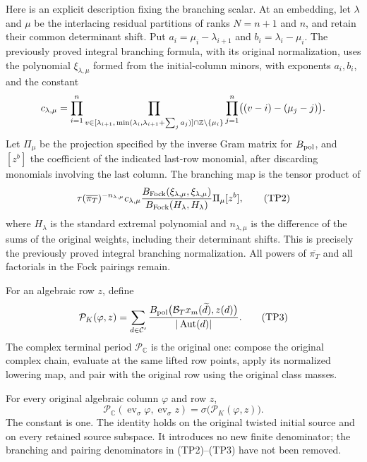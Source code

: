 Here is an explicit description fixing the branching scalar. At an
embedding, let $\lambda$ and $\mu$ be the interlacing residual
partitions of ranks $N=n+1$ and $n$, and retain their common determinant
shift. Put $a_i=\mu_i-\lambda_{i+1}$ and
$b_i=\lambda_i-\mu_i$. The previously proved integral branching
formula, with its original normalization\cite{theta-period-branching}, uses the polynomial
$\xi_{\lambda,\mu}$ formed from the initial-column minors, with
exponents $a_i,b_i$, and the constant
\[
 c_{\lambda,\mu}=
 \prod_{i=1}^n\space
 \prod_{v\in [\lambda_{i+1},\,\min(\lambda_i,\lambda_{i+1}+
                                     \sum_j a_j)]\cap\mathbb Z
                       \setminus\{\mu_i\}}
 \prod_{j=1}^n\bigl((v-i)-(\mu_j-j)\bigr).
\]
Let $\Pi_\mu$ be the projection specified by the inverse Gram matrix
for $B_{\rm pol}$, and $[z^b]$ the coefficient of the indicated
last-row monomial, after discarding monomials involving the last
column. The branching map is the tensor product of
\[
 \tau(\overline{\pi_T})^{-n_{\lambda,\mu}}
 c_{\lambda,\mu}
 \frac{B_{\rm Fock}(\xi_{\lambda,\mu},\xi_{\lambda,\mu})}
      {B_{\rm Fock}(H_\lambda,H_\lambda)}
                 \Pi_\mu[z^b],
 \tag{TP2}
\]
where $H_\lambda$ is the standard extremal polynomial and
$n_{\lambda,\mu}$ is the difference of the sums of the original
weights, including their determinant shifts. This is precisely the
previously proved integral branching normalization. All powers of
$\overline{\pi_T}$ and all factorials in the Fock pairings remain.

For an algebraic row $z$, define
\[
 \mathcal P_K(\varphi,z)=
 \sum_{d\in\mathcal C'}\frac{
   B_{\rm pol}\bigl(\mathcal B_T x_m(\widetilde d),z(d)\bigr)}
                              {|\operatorname{Aut}(d)|}.
 \tag{TP3}
\]
The complex terminal period $\mathcal P_{\mathbb C}$ is the original
one: compose the original complex chain, evaluate at the same lifted
row points, apply its normalized lowering map, and pair with the
original row using the original class masses.

\begin{theorem}
\label{thm:actual-algebraic-terminal-period}
For every original algebraic column $\varphi$ and row $z$,
\[
 \mathcal P_{\mathbb C}(\operatorname{ev}_\sigma\varphi,
                       \operatorname{ev}_\sigma z)
                         =\sigma\bigl(\mathcal P_K(\varphi,z)\bigr).
 \tag{TP4}
\]
The constant is one. The identity holds on the original twisted
initial source and on every retained source subspace. It introduces
no new finite denominator; the branching and pairing denominators
in (TP2)--(TP3) have not been removed.
\end{theorem}

